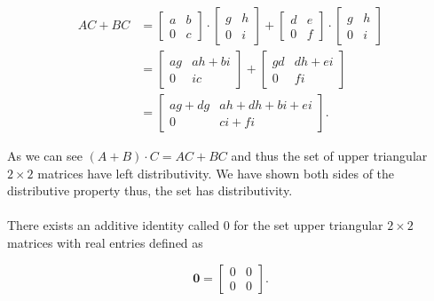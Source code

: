 \documentclass{article}
\begin{document}
    \begin{equation*}
      \begin{split}
        AC + BC &= 
          \begin{bmatrix}
            a & b\\
            0 & c
          \end{bmatrix} \cdot
          \begin{bmatrix}
            g & h\\
            0 & i
          \end{bmatrix}
         +
         \begin{bmatrix}
          d & e\\
          0 & f
        \end{bmatrix} \cdot
        \begin{bmatrix} 
          g & h\\
          0 & i
        \end{bmatrix}\\
        &=
          \begin{bmatrix}
            ag & ah+bi\\
            0 & ic
          \end{bmatrix}
          +
          \begin{bmatrix}
            gd & dh+ei\\
            0 & fi
          \end{bmatrix}\\
        &=
          \begin{bmatrix}
            ag+dg & ah+dh+bi+ei\\
            0 & ci+fi
          \end{bmatrix}.
      \end{split}
    \end{equation*}

    As we can see $(A+B) \cdot C = AC + BC$ and thus the set of upper triangular $2 \times 2$ matrices have left distributivity. We have shown both sides of the distributive property thus, the set has distributivity.

    \paragraph{}
    There exists an additive identity called 0 for the set upper triangular $2\times 2 $ matrices with real entries defined as 

    \[
      \textbf{0} = \begin{bmatrix}
        0 & 0\\
        0 & 0
      \end{bmatrix}.
    \]
\end{document}

